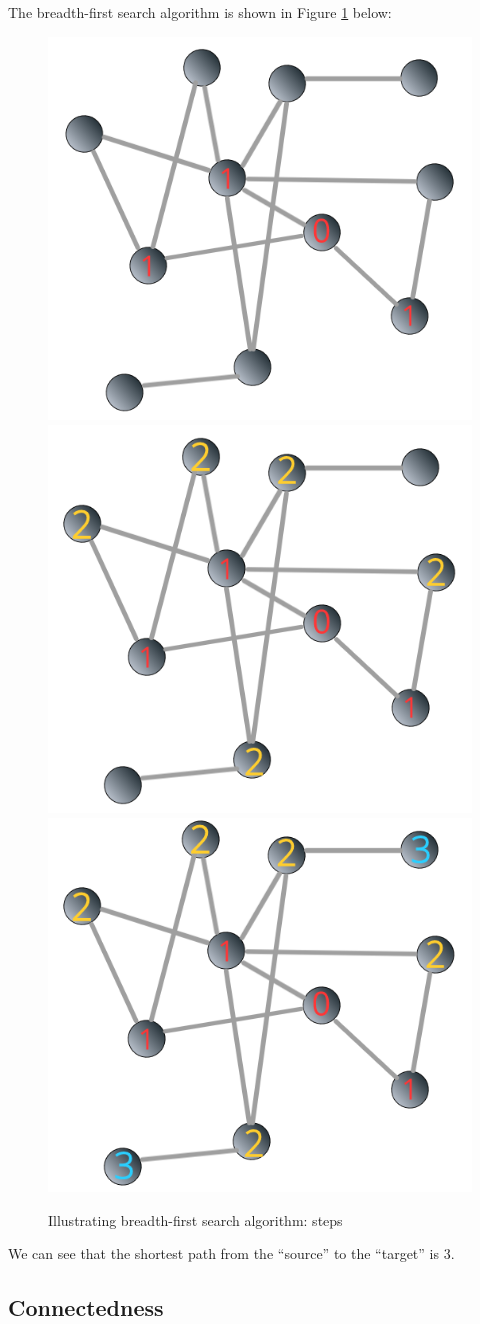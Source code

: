 \documentclass[
]{krantz}
\begin{document}
The breadth-first search algorithm is shown in Figure \ref{fig:bfs} below:

\begin{figure}

{\centering \includegraphics[width=0.5\linewidth]{images/bfs02} \includegraphics[width=0.5\linewidth]{images/bfs03} \includegraphics[width=0.5\linewidth]{images/bfs04} 

}

\caption{Illustrating breadth-first search algorithm: steps}\label{fig:bfs}
\end{figure}

We can see that the shortest path from the ``source'' to the ``target'' is \(3\).

\hypertarget{connectedness}{%
\subsection{Connectedness}\label{connectedness}}
\end{document}
